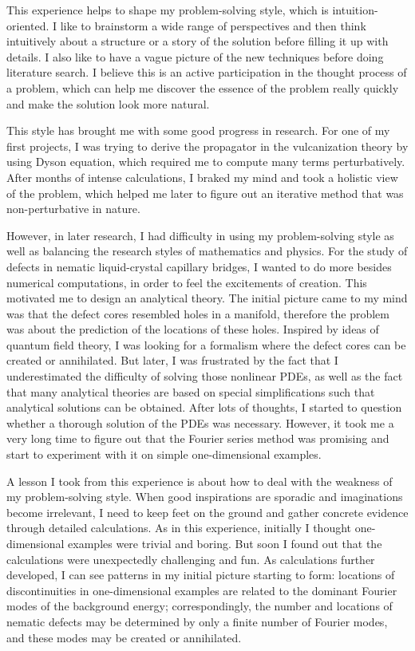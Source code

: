 \documentclass[nottitlepage]{article}
\begin{document}
This experience helps to shape my problem-solving style, which is intuition-oriented. I like to brainstorm a wide range of perspectives and then think intuitively about a structure or a story of the solution before filling it up with details. I also like to have a vague picture of the new techniques before doing literature search. I believe this is an active participation in the thought process of a problem, which can help me discover the essence of the problem really quickly and make the solution look more natural. %

This style has brought me with some good progress in research. For one of my first projects, I was trying to derive the propagator in the vulcanization theory by using Dyson equation, which required me to compute many terms perturbatively. After months of intense calculations, I braked my mind and took a holistic view of the problem, which helped me later to figure out an iterative method that was non-perturbative in nature. 

However, in later research, I had difficulty in using my problem-solving style as well as balancing the research styles of mathematics and physics. For the study of defects in nematic liquid-crystal capillary bridges, I wanted to do more besides numerical computations, in order to feel the excitements of creation. This motivated me to design an analytical theory. The initial picture came to my mind was that the defect cores resembled holes in a manifold, therefore the problem was about the prediction of the locations of these holes. Inspired by ideas of quantum field theory, I was looking for a formalism where the defect cores can be created or annihilated. But later, I was frustrated by the fact that I underestimated the difficulty of solving those nonlinear PDEs, as well as the fact that many analytical theories are based on special simplifications such that analytical solutions can be obtained. After lots of thoughts, I started to question whether a thorough solution of the PDEs was necessary. However, it took me a very long time to figure out that the Fourier series method was promising and start to experiment with it on simple one-dimensional examples. 

A lesson I took from this experience is about how to deal with the weakness of my problem-solving style. When good inspirations are sporadic and imaginations become irrelevant, I need to keep feet on the ground and gather concrete evidence through detailed calculations. As in this experience, initially I thought one-dimensional examples were trivial and boring. But soon I found out that the calculations were unexpectedly challenging and fun. As calculations further developed, I can see patterns in my initial picture starting to form: locations of discontinuities in one-dimensional examples are related to the dominant Fourier modes of the background energy; correspondingly, the number and locations of nematic defects may be determined by only a finite number of Fourier modes, and these modes may be created or annihilated.  
\end{document}
